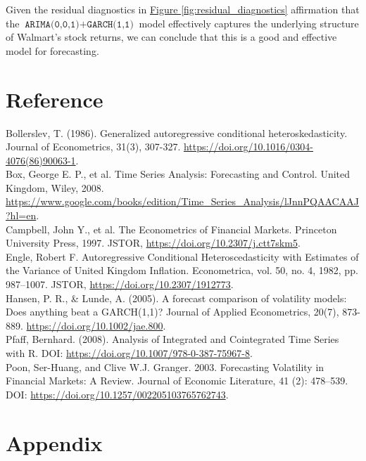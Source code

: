 \documentclass{article}
\newcommand{\1}{\mathbbm{1}}
\theoremstyle{definition}
\begin{document}
Given the residual diagnostics in \hyperref[fig:residual_diagnostics]{Figure \ref{fig:residual_diagnostics}} affirmation that the $\texttt{ARIMA(0,0,1)} + \texttt{GARCH(1,1)}$ model effectively captures the underlying structure of Walmart's stock returns, we can conclude that this is a good and effective model for forecasting.



\newpage
\section{Reference}

Bollerslev, T. (1986). Generalized autoregressive conditional heteroskedasticity. Journal of Econometrics, 31(3), 307-327. \url{https://doi.org/10.1016/0304-4076(86)90063-1}.\\

Box, George E. P., et al. Time Series Analysis: Forecasting and Control. United Kingdom, Wiley, 2008. \url{https://www.google.com/books/edition/Time_Series_Analysis/lJnnPQAACAAJ?hl=en}.\\

Campbell, John Y., et al. The Econometrics of Financial Markets. Princeton University Press, 1997. JSTOR, \url{https://doi.org/10.2307/j.ctt7skm5}.\\

Engle, Robert F. Autoregressive Conditional Heteroscedasticity with Estimates of the Variance of United Kingdom Inflation. Econometrica, vol. 50, no. 4, 1982, pp. 987–1007. JSTOR, \url{https://doi.org/10.2307/1912773}.\\

Hansen, P. R., \& Lunde, A. (2005). A forecast comparison of volatility models: Does anything beat a GARCH(1,1)? Journal of Applied Econometrics, 20(7), 873-889. \url{https://doi.org/10.1002/jae.800}.\\

Pfaff, Bernhard. (2008). Analysis of Integrated and Cointegrated Time Series with R. DOI: \url{https://doi.org/10.1007/978-0-387-75967-8}.\\

Poon, Ser-Huang, and Clive W.J. Granger. 2003. Forecasting Volatility in Financial Markets: A Review. Journal of Economic Literature, 41 (2): 478–539. DOI: \url{https://doi.org/10.1257/002205103765762743}.




\newpage
\section{Appendix}
\end{document}
